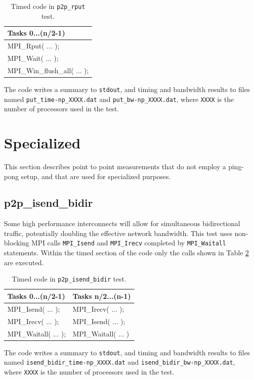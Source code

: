 \documentclass[10pt,a4paper]{report}
\begin{document}
\begin{table}[ht]
\centering
\caption{Timed code in \texttt{p2p\_rput} test.}
\label{tab:rput}
\begin{tabular}{|l|}
\hline
\bf{Tasks 0...(n/2-1)} \\\hline
MPI\_Rput( ... );      \\
MPI\_Wait( ... );      \\
MPI\_Win\_flush\_all( ... );\\\hline
\end{tabular}
\end{table}

The code writes a summary to \verb+stdout+, and timing and bandwidth results to files named \verb+put_time-np_XXXX.dat+ and \verb+put_bw-np_XXXX.dat+, where \verb+XXXX+ is the number of processors used in the test.

\section{Specialized}
This section describes point to point measurements that do not employ a ping-pong setup, and that are used for specialized purposes.

\FloatBarrier
\subsection{p2p\_isend\_bidir}
Some high performance interconnects will allow for simultaneous bidirectional traffic, potentially doubling the effective network bandwidth. This test uses non-blocking MPI calls \verb+MPI_Isend+ and \verb+MPI_Irecv+ completed by \verb+MPI_Waitall+ statements. 
Within the timed section of the code only the calls shown in Table \ref{tab:bidir} are executed.

\begin{table}[ht]
\centering
\caption{Timed code in \texttt{p2p\_isend\_bidir} test.}
\label{tab:bidir}
\begin{tabular}{|l|l|}
\hline
\bf{Tasks 0...(n/2-1)}	& \bf{Tasks n/2...(n-1)}\\\hline
MPI\_Isend( ... );      & MPI\_Irecv( ... );\\
MPI\_Irecv( ... );      & MPI\_Isend( ... );\\
MPI\_Waitall( ... );    & MPI\_Waitall( ... )\\\hline
\end{tabular}
\end{table}

The code writes a summary to \verb+stdout+, and timing and bandwidth results to files named \verb+isend_bidir_time-np_XXXX.dat+ and \verb+isend_bidir_bw-np_XXXX.dat+, where \verb+XXXX+ is the number of processors used in the test.
\end{document}
